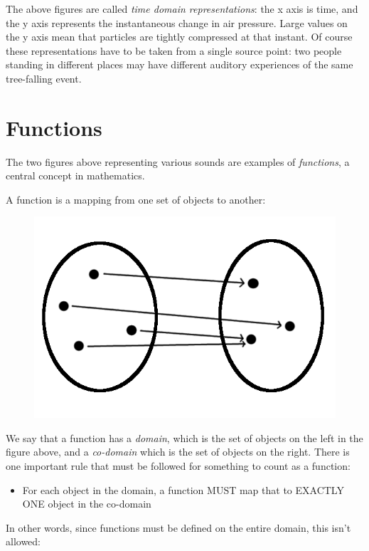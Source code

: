 \documentclass[UTF8]{book}
\begin{document}
\begin{CJK}{UTF8}{gbsn}
The above figures are called \emph{time domain representations}: the x axis is time, and the y axis represents the instantaneous change in air pressure. Large values on the y axis mean that particles are tightly compressed at that instant. Of course these representations have to be taken from a single source point: two people standing in different places may have different auditory experiences of the same tree-falling event.

\section{Functions}

The two figures above representing various sounds are examples of \emph{functions}, a central concept in mathematics.

A function is a mapping from one set of objects to another:

\begin{figure}[H]
\centering
\includegraphics[width=0.8\linewidth]{function_basic}
\end{figure}

We say that a function has a \emph{domain}, which is the set of objects on the left in the figure above, and a \emph{co-domain} which is the set of objects on the right. There is one important rule that must be followed for something to count as a function:

\begin{itemize}
\item For each object in the domain, a function MUST map that to EXACTLY ONE object in the co-domain
\end{itemize}

In other words, since functions must be defined on the entire domain, this isn't allowed:


\end{CJK}
\end{document}
